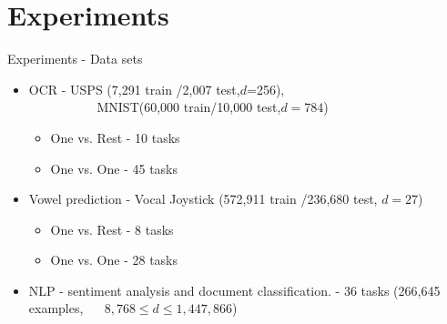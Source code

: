\documentclass{beamer}
\begin{document}


\section{Experiments}

\begin{frame}{Experiments - Data sets}

\begin{itemize}
\item OCR - USPS \!(7,291 train /2,007 test,$d$=256),\\~~~~~~~~~~
 MNIST\!(60,000 train/10,000 test,$d=784$)  \newline
\begin{itemize}
\item One vs. Rest - 10 tasks\newline
\item One vs. One - 45 tasks \newline
\end{itemize}
\item Vowel prediction - Vocal Joystick (572,911 train /236,680 test, $d=27$)\newline
\begin{itemize}
\item One vs. Rest - 8 tasks\newline
\item One vs. One - 28 tasks \newline
\end{itemize}
\item NLP - sentiment analysis and document classification. - 36 tasks (266,645 examples,\newline
~~ $8,768\le d\le 1,447,866$)\newline
\end{itemize}
\end{frame}
\end{document}
